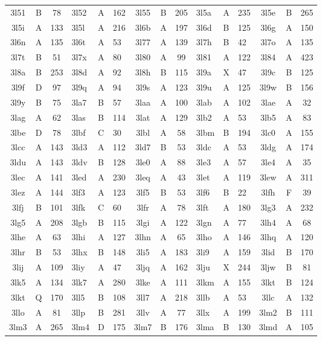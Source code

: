 \begin{longtable}{|c|c|c| a|a|a| c|c|c| a|a|a| c|c|c|}
3l51 & B & 78 & 3l52 & A & 162 & 3l55 & B & 205 & 3l5a & A & 235 & 3l5e & B & 265\\
3l5i & A & 133 & 3l5l & A & 216 & 3l6b & A & 197 & 3l6d & B & 125 & 3l6g & A & 150\\
3l6n & A & 135 & 3l6t & A & 53 & 3l77 & A & 139 & 3l7h & B & 42 & 3l7o & A & 135\\
3l7t & B & 51 & 3l7x & A & 80 & 3l80 & A & 99 & 3l81 & A & 122 & 3l84 & A & 423\\
3l8a & B & 253 & 3l8d & A & 92 & 3l8h & B & 115 & 3l9a & X & 47 & 3l9c & B & 125\\
3l9f & D & 97 & 3l9q & A & 94 & 3l9s & A & 123 & 3l9u & A & 125 & 3l9w & B & 156\\
3l9y & B & 75 & 3la7 & B & 57 & 3laa & A & 100 & 3lab & A & 102 & 3lae & A & 32\\
3lag & A & 62 & 3las & B & 114 & 3lat & A & 129 & 3lb2 & A & 53 & 3lb5 & A & 83\\
3lbe & D & 78 & 3lbf & C & 30 & 3lbl & A & 58 & 3lbm & B & 194 & 3lc0 & A & 155\\
3lcc & A & 143 & 3ld3 & A & 112 & 3ld7 & B & 53 & 3ldc & A & 53 & 3ldg & A & 174\\
3ldu & A & 143 & 3ldv & B & 128 & 3le0 & A & 88 & 3le3 & A & 57 & 3le4 & A & 35\\
3lec & A & 141 & 3led & A & 230 & 3leq & A & 43 & 3let & A & 119 & 3lew & A & 311\\
3lez & A & 144 & 3lf3 & A & 123 & 3lf5 & B & 53 & 3lf6 & B & 22 & 3lfh & F & 39\\
3lfj & B & 101 & 3lfk & C & 60 & 3lfr & A & 78 & 3lft & A & 180 & 3lg3 & A & 232\\
3lg5 & A & 208 & 3lgb & B & 115 & 3lgi & A & 122 & 3lgn & A & 77 & 3lh4 & A & 68\\
3lhe & A & 63 & 3lhi & A & 127 & 3lhn & A & 65 & 3lho & A & 146 & 3lhq & A & 120\\
3lhr & B & 53 & 3lhx & B & 148 & 3li5 & A & 183 & 3li9 & A & 159 & 3lid & B & 170\\
3lij & A & 109 & 3liy & A & 47 & 3ljq & A & 162 & 3lju & X & 244 & 3ljw & B & 81\\
3lk5 & A & 134 & 3lk7 & A & 280 & 3lke & A & 111 & 3lkm & A & 155 & 3lkt & B & 124\\
3lkt & Q & 170 & 3ll5 & B & 108 & 3ll7 & A & 218 & 3llb & A & 53 & 3llc & A & 132\\
3llo & A & 81 & 3llp & B & 281 & 3llv & A & 77 & 3llx & A & 199 & 3lm2 & B & 111\\
3lm3 & A & 265 & 3lm4 & D & 175 & 3lm7 & B & 176 & 3lma & B & 130 & 3lmd & A & 105\\

\end{longtable}

